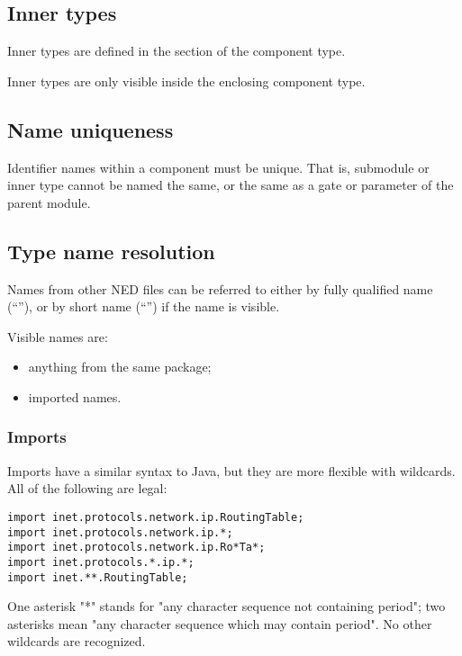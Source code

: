 \subsection{Inner types}
\label{ch-ned-ref:sec:inner-types}

Inner types are defined in the  section of the component type.

Inner types are only visible inside the enclosing component type.



\subsection{Name uniqueness}

Identifier names within a component must be unique. That is, submodule
or inner type cannot be named the same, or the same as a gate or
parameter of the parent module.



\subsection{Type name resolution}
\label{ch-ned-ref:sec:type-name-resolution}

Names from other NED files can be referred to either by fully qualified
name (``''), or by short name
(``'') if the name is visible.

Visible names are:

\begin{itemize}
  \item anything from the same package;
  \item imported names.
\end{itemize}

\subsubsection{Imports}

Imports have a similar syntax to Java, but they are more flexible with wildcards.
All of the following are legal:
\begin{verbatim}
import inet.protocols.network.ip.RoutingTable;
import inet.protocols.network.ip.*;
import inet.protocols.network.ip.Ro*Ta*;
import inet.protocols.*.ip.*;
import inet.**.RoutingTable;
\end{verbatim}

One asterisk "*" stands for "any character sequence not containing
period"; two asterisks mean "any character sequence which may
contain period". No other wildcards are recognized.

